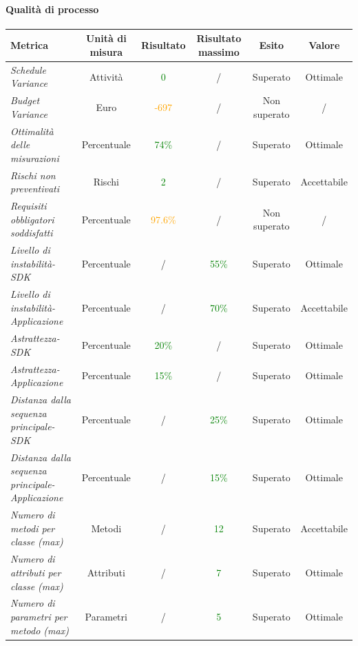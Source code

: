 \paragraph{Qualità di processo}
\begin{longtable}{|>{\centering}m{5cm}|c|c|c|c|c|}
\hline
\textbf{Metrica} & \textbf{Unità di misura} & \textbf{Risultato} & \textbf{Risultato massimo} & \textbf{Esito} & \textbf{Valore}\\
\hline
\endhead
\emph{Schedule Variance} & {Attività} & \textcolor{Green}{0} & / & Superato & Ottimale\\ \hline
\emph{Budget Variance} & {Euro} & \textcolor{Orange}{-697} & / & Non superato & /\\ \hline
\emph{Ottimalità delle misurazioni} & {Percentuale} & \textcolor{Green}{74\%} & / & Superato & Ottimale \\ \hline
\emph{Rischi non preventivati} & {Rischi} & \textcolor{Green}{2} & / & Superato & Accettabile\\ \hline
\emph{Requisiti obbligatori soddisfatti} & {Percentuale} & \textcolor{Orange}{97.6\%} & / & Non superato & /\\ \hline
\emph{Livello di instabilità-SDK} & {Percentuale} & / & \textcolor{Green}{55\%} & Superato & Ottimale\\ \hline
\emph{Livello di instabilità-Applicazione} & {Percentuale} & / & \textcolor{Green}{70\%} & Superato & Accettabile\\ \hline
\emph{Astrattezza-SDK} & {Percentuale} & \textcolor{Green}{20\%} & / & Superato & Ottimale\\ \hline
\emph{Astrattezza-Applicazione} & {Percentuale} &\textcolor{Green}{15\%} & / & Superato & Ottimale\\ \hline
\emph{Distanza dalla sequenza principale-SDK} & {Percentuale} & / & \textcolor{Green}{25\%} & Superato & Ottimale\\ \hline
\emph{Distanza dalla sequenza principale-Applicazione} & {Percentuale} & / & \textcolor{Green}{15\%} & Superato & Ottimale\\ \hline
\emph{Numero di metodi per classe (max)} & {Metodi} & / & \textcolor{Green}{12} & Superato & Accettabile\\ \hline
\emph{Numero di attributi per classe (max)} & {Attributi} & / & \textcolor{Green}{7} & Superato & Ottimale\\ \hline
\emph{Numero di parametri per metodo (max)} & {Parametri} & / & \textcolor{Green}{5} & Superato & Ottimale\\ \hline

\end{longtable}

